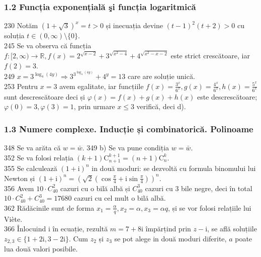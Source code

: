 \documentclass[11pt]{article}
\begin{document}
\subsubsection*{1.2 Funcția exponențială şi funcția logaritmică}
230 Notăm $(1+\sqrt{3})^{x}=t>0$ și inecuația devine $(t-1)^{2}(t+2)>0$ cu soluția $t \in(0, \infty) \setminus\{0\}$.\\
245 Se va observa că funcția $f:[2, \infty) \rightarrow \mathbb{R}, f(x)=2^{\sqrt{x-2}}+3^{\sqrt{x^{2}-4}}+4^{\sqrt{x^{2}-x-2}}$ este strict crescătoare, iar $f(2)=3$.\\
249 $x=3^{\log _{4}(4 y)} \Rightarrow 3^{3^{\log _{4}(4 y)}}+4^{y}=13$ care are soluție unică.\\
253 Pentru $x=3$ avem egalitate, iar funcțiile $f(x)=\frac{3^{x}}{6^{x}}, g(x)=\frac{4^{x}}{6^{x}}, h(x)=\frac{5^{x}}{6^{x}}$ sunt descrescătoare deci și $\varphi(x)=f(x)+g(x)+h(x)$ este descrescătoare; $\varphi(0)=3, \varphi(3)=1$, prin urmare $x \leq 3$ verifică, deci d).\\

\subsubsection*{1.3 Numere complexe. Inducție și combinatorică. Polinoame}
348 Se va arăta că $w=\bar{w}$. 349 b) Se va pune condiția $w=\bar{w}$.\\
352 Se va folosi relația $(k+1) \mathrm{C}_{n+1}^{k+1}=(n+1) \mathrm{C}_{n}^{k}$.\\
355 Se calculează $(1+\mathrm{i})^{n}$ in două moduri: se dezvoltă cu formula binomului lui Newton și $(1+\mathrm{i})^{n}=\left(\sqrt{2}\left(\cos \frac{\pi}{4}+\mathrm{i} \sin \frac{\pi}{4}\right)\right)^{n}$.\\
356 Avem $10 \cdot C_{40}^{2}$ cazuri cu o bilă albă și $C_{40}^{3}$ cazuri cu 3 bile negre, deci în total $10 \cdot C_{40}^{2}+C_{40}^{3}=17680$ cazuri cu cel mult o bilă albă.\\
362 Rădăcinile sunt de forma $x_{1}=\frac{\alpha}{q}, x_{2}=\alpha, x_{3}=\alpha q$, și se vor folosi relațiile lui Viète.\\
366 Înlocuind i în ecuație, rezultă $m=7+8 \mathrm{i}$ împărțind prin $z-\mathrm{i}$, se află soluțiile $z_{2,3} \in\{1+2 \mathrm{i}, 3-2 \mathrm{i}\}$. Cum $z_{2}$ și $z_{3}$ se pot alege in două moduri diferite, $a$ poate lua două valori posibile.\\
\end{document}
